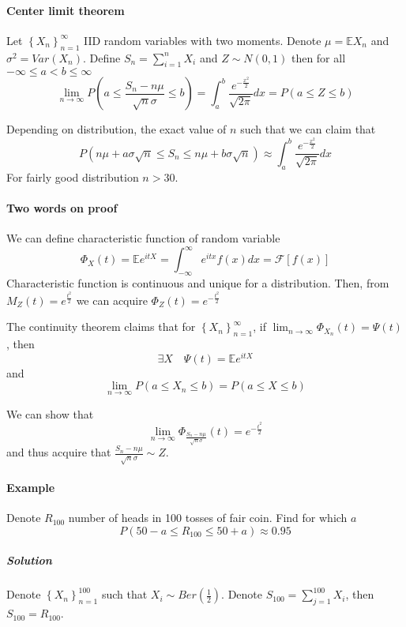 \paragraph{Center limit theorem}
Let $\left\{ X_n \right\}_{n=1}^\infty$ 
IID random variables with two moments. Denote $\mu = \mathbb{E}X_n$ and $\sigma^2 = Var(X_n)$. 
Define $S_n = \sum_{i=1}^n X_i$ and $Z \sim N(0,1)$ then for all $-\infty \leq a < b \leq \infty$ 
	$$\lim_{n \to \infty} P \left( a \leq \frac{S_n-n\mu}{\sqrt{n} \sigma} \leq b \right) = \int_a^b \frac{e^{-\frac{x^2}{2}}}{\sqrt{2\pi}} dx = P(a \leq Z \leq b)$$ 
	
Depending on distribution, the exact value of $n$ such that we can claim that $$P \left( n\mu + a\sigma \sqrt{n} \leq S_n \leq  n\mu + b\sigma \sqrt{n}  \right) \approx \int_a^b\frac{e^{-\frac{x^2}{2}}}{\sqrt{2\pi}} dx $$
For fairly good distribution $n > 30$.

\paragraph{Two words on proof}
We can define characteristic function of random variable
$$\Phi_X(t) = \mathbb{E} e^{itX} = \int_{-\infty}^{\infty} e^{itx} f(x) dx = \mathcal{F} [f(x)]$$
Characteristic function  is continuous and unique for a distribution. Then, from $M_Z(t) = e^{\frac{t^2}{2}}$ we can acquire $\Phi_Z(t) =  e^{-\frac{t^2}{2}}$

The continuity theorem claims that for $\left\{ X_n \right\}_{n=1}^\infty $, if $\lim_{n \to \infty} \Phi_{X_n}(t) = \Psi(t)$, then 
$$\exists X \quad \Psi(t) = \mathbb{E} e^{itX}$$
and
$$\lim_{n \to \infty}  P(a\leq X_n \leq b) = P(a\leq X \leq b)$$

We can show that
$$\lim_{n \to \infty} \Phi_{\frac{S_n-n\mu}{\sqrt{n} \sigma}} (t) = e^{-\frac{t^2}{2}}$$
and thus acquire that $\frac{S_n-n\mu}{\sqrt{n} \sigma} \sim Z$.
\paragraph{Example}
Denote $R_{100}$ number of heads in 100 tosses of fair coin. Find for which $a$
$$P(50-a\leq R_{100} \leq 50+a) \approx 0.95 $$
\subparagraph{Solution}
Denote 
$\left\{ X_n \right\}_{n=1}^{100}$ such that $X_i \sim Ber \left( \frac{1}{2} \right)$. Denote $S_{100} = \sum_{j=1}^{100}X_i$, then $S_{100}=R_{100}$.

